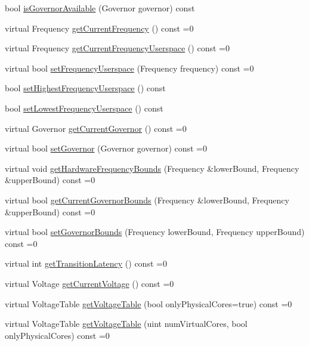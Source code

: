 \begin{DoxyCompactItemize}
\item 
bool \hyperlink{classmammut_1_1cpufreq_1_1Domain_a0e4d5b325d00884509f3c1f34d2525a3}{is\-Governor\-Available} (Governor governor) const 
\item 
virtual Frequency \hyperlink{classmammut_1_1cpufreq_1_1Domain_a915d7a5e4da2fe377c9805e86820ac3e}{get\-Current\-Frequency} () const =0
\item 
virtual Frequency \hyperlink{classmammut_1_1cpufreq_1_1Domain_abb5e1908d54a2af862e78b03a1a85af4}{get\-Current\-Frequency\-Userspace} () const =0
\item 
virtual bool \hyperlink{classmammut_1_1cpufreq_1_1Domain_a6f97e04fa138bbb6b478c8a7338b4116}{set\-Frequency\-Userspace} (Frequency frequency) const =0
\item 
bool \hyperlink{classmammut_1_1cpufreq_1_1Domain_ab4a7179ca9f0b0ed372579dacc93c196}{set\-Highest\-Frequency\-Userspace} () const 
\item 
bool \hyperlink{classmammut_1_1cpufreq_1_1Domain_ae473572f0b075de12bcf063b49815086}{set\-Lowest\-Frequency\-Userspace} () const 
\item 
virtual Governor \hyperlink{classmammut_1_1cpufreq_1_1Domain_a938483ec97ed59d0559758a1a467dc62}{get\-Current\-Governor} () const =0
\item 
virtual bool \hyperlink{classmammut_1_1cpufreq_1_1Domain_a48cb064376b9b663e5a134a61b5780bd}{set\-Governor} (Governor governor) const =0
\item 
virtual void \hyperlink{classmammut_1_1cpufreq_1_1Domain_a652712c9192a755fb2bc6b58076eccb8}{get\-Hardware\-Frequency\-Bounds} (Frequency \&lower\-Bound, Frequency \&upper\-Bound) const =0
\item 
virtual bool \hyperlink{classmammut_1_1cpufreq_1_1Domain_af95ae412f43dfbf60a77715ef4684c0f}{get\-Current\-Governor\-Bounds} (Frequency \&lower\-Bound, Frequency \&upper\-Bound) const =0
\item 
virtual bool \hyperlink{classmammut_1_1cpufreq_1_1Domain_a45a0a69b4957937c921e723bbcf6cf04}{set\-Governor\-Bounds} (Frequency lower\-Bound, Frequency upper\-Bound) const =0
\item 
virtual int \hyperlink{classmammut_1_1cpufreq_1_1Domain_a0c7d34dc9ee1e5eb57200a127ae9f183}{get\-Transition\-Latency} () const =0
\item 
virtual Voltage \hyperlink{classmammut_1_1cpufreq_1_1Domain_acd823bdc2f011c042dbb272c4d63df3c}{get\-Current\-Voltage} () const =0
\item 
virtual Voltage\-Table \hyperlink{classmammut_1_1cpufreq_1_1Domain_ad0b11fad2e36e45d6028de662df63ba8}{get\-Voltage\-Table} (bool only\-Physical\-Cores=true) const =0
\item 
virtual Voltage\-Table \hyperlink{classmammut_1_1cpufreq_1_1Domain_a4442dfd2b7d52a95ad4bdf3e99185bf3}{get\-Voltage\-Table} (uint num\-Virtual\-Cores, bool only\-Physical\-Cores) const =0
\end{DoxyCompactItemize}
